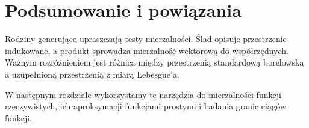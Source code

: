 \section{Podsumowanie i powiązania}

Rodziny generujące upraszczają testy mierzalności.
Ślad opisuje przestrzenie indukowane, a produkt
sprowadza mierzalność wektorową do współrzędnych.
Ważnym rozróżnieniem jest różnica między przestrzenią
standardową borelowską a uzupełnioną przestrzenią
z miarą Lebesgue'a.

W następnym rozdziale wykorzystamy te narzędzia do
mierzalności funkcji rzeczywistych, ich aproksymacji
funkcjami prostymi i badania granic ciągów funkcji.

